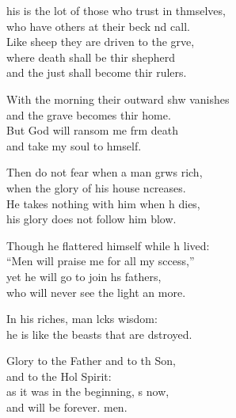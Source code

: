 \settowidth{\versewidth}{This is the lot of those who trust in themselves, *}
\begin{psalmverse}%
  \begin{patverse}
his is the lot of those who trust in thmselves,\Med\\
who have others at their beck nd call.\\
Like sheep they are driven to the grve,\Flex\\
where death shall be thir shepherd\Med\\
and the just shall become thir rulers.

With the morning their outward shw vanishes\Med\\
and the grave becomes thir home.\\
But God will ransom me frm death\Med\\
and take my soul to h\pointup{\i}mself.

Then do not fear when a man grws rich,\Med\\
when the glory of his house \pointup{\i}ncreases.\\
He takes nothing with him when h dies,\Med\\
his glory does not follow him blow.

Though he flattered himself while h lived:\Med\\
“Men will praise me for all my sccess,”\\
yet he will go to join h\pointup{\i}s fathers,\Med\\
who will never see the light an more.

In his riches, man lcks wisdom:\Med\\
he is like the beasts that are dstroyed.

Glory to the Father and to th Son,\Med\\
and to the Hol Spirit:\\
as it was in the beginning, \pointup{\i}s now,\Med\\
and will be forever. men. 
  \end{patverse}
\end{psalmverse}
